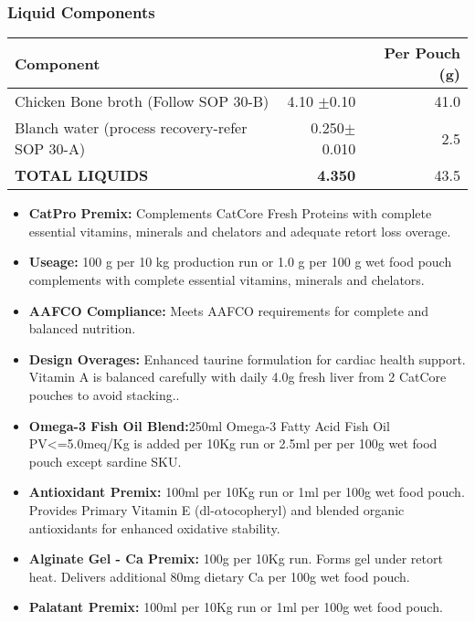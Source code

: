 \subsubsection*{Liquid Components}
\begin{tabular}{@{}lrr@{}}
\toprule
\textbf{Component} & \textbf{Per Batch (kg)  & \textbf{Per Pouch (g)}} \\
\midrule 
Chicken Bone broth (Follow SOP 30-B) &  4.10 $\pm$0.10 & 41.0 \\
Blanch water (process recovery-refer SOP 30-A) & 0.250$\pm$0.010 & 2.5 \\
\textbf{TOTAL LIQUIDS} & \textbf {4.350} & {43.5} \textbf \\
\midrule

\bottomrule

\end{tabular}

\vspace{1em}

\begin{itemize}
\item \textbf{CatPro Premix: } Complements CatCore Fresh Proteins with complete essential vitamins, minerals and chelators and adequate retort loss overage.
\item \textbf{Useage:} 100 g per 10 kg production run or 1.0 g per 100 g wet food pouch complements with complete essential vitamins, minerals and chelators. \item\textbf{AAFCO Compliance: } Meets AAFCO requirements for complete and balanced nutrition.
\item\textbf{Design Overages: }Enhanced taurine formulation for cardiac health support. Vitamin A is balanced carefully with daily 4.0g fresh liver from 2 CatCore pouches to avoid stacking.\cite{ref64}.  
\item \textbf{Omega-3 Fish Oil Blend:}250ml Omega-3 Fatty Acid Fish Oil PV<=5.0meq/Kg is added per 10Kg run or 2.5ml per per 100g wet food pouch except sardine SKU.
\item \textbf{Antioxidant Premix: } 100ml per 10Kg run or 1ml per 100g wet food pouch. Provides Primary Vitamin E (dl-$\alpha$tocopheryl) and blended organic antioxidants for enhanced oxidative stability.
\item \textbf{Alginate Gel - Ca Premix:} 100g per 10Kg run.  Forms gel under retort heat. Delivers additional 80mg dietary Ca per 100g wet food pouch.
\item \textbf{Palatant Premix: } 100ml per 10Kg run or 1ml per 100g wet food pouch.
\end{itemize}
